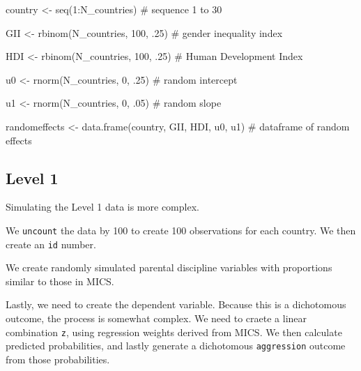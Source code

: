 \documentclass[
  letterpaper,
  DIV=11,
  numbers=noendperiod]{scrreprt}
\newenvironment{Shaded}{\begin{snugshade}}{\end{snugshade}}
\newcommand{\CommentTok}[1]{\textcolor[rgb]{0.37,0.37,0.37}{#1}}
\newcommand{\DecValTok}[1]{\textcolor[rgb]{0.68,0.00,0.00}{#1}}
\newcommand{\FunctionTok}[1]{\textcolor[rgb]{0.28,0.35,0.67}{#1}}
\newcommand{\NormalTok}[1]{\textcolor[rgb]{0.00,0.23,0.31}{#1}}
\newcommand{\OtherTok}[1]{\textcolor[rgb]{0.00,0.23,0.31}{#1}}
\newcommand{\SpecialCharTok}[1]{\textcolor[rgb]{0.37,0.37,0.37}{#1}}
\begin{document}
\begin{Shaded}
\begin{Highlighting}[]
\NormalTok{country }\OtherTok{\textless{}{-}} \FunctionTok{seq}\NormalTok{(}\DecValTok{1}\SpecialCharTok{:}\NormalTok{N\_countries) }\CommentTok{\# sequence 1 to 30}

\NormalTok{GII }\OtherTok{\textless{}{-}} \FunctionTok{rbinom}\NormalTok{(N\_countries, }\DecValTok{100}\NormalTok{, .}\DecValTok{25}\NormalTok{) }\CommentTok{\# gender inequality index}

\NormalTok{HDI }\OtherTok{\textless{}{-}} \FunctionTok{rbinom}\NormalTok{(N\_countries, }\DecValTok{100}\NormalTok{, .}\DecValTok{25}\NormalTok{) }\CommentTok{\# Human Development Index}

\NormalTok{u0 }\OtherTok{\textless{}{-}} \FunctionTok{rnorm}\NormalTok{(N\_countries, }\DecValTok{0}\NormalTok{, .}\DecValTok{25}\NormalTok{) }\CommentTok{\# random intercept}

\NormalTok{u1 }\OtherTok{\textless{}{-}} \FunctionTok{rnorm}\NormalTok{(N\_countries, }\DecValTok{0}\NormalTok{, .}\DecValTok{05}\NormalTok{) }\CommentTok{\# random slope}

\NormalTok{randomeffects }\OtherTok{\textless{}{-}} \FunctionTok{data.frame}\NormalTok{(country, }
\NormalTok{                            GII, }
\NormalTok{                            HDI, }
\NormalTok{                            u0, }
\NormalTok{                            u1) }\CommentTok{\# dataframe of random effects}
\end{Highlighting}
\end{Shaded}

\hypertarget{level-1}{%
\subsection{Level 1}\label{level-1}}

Simulating the Level 1 data is more complex.

We \texttt{uncount} the data by 100 to create 100 observations for each
country. We then create an \texttt{id} number.

We create randomly simulated parental discipline variables with
proportions similar to those in MICS.

Lastly, we need to create the dependent variable. Because this is a
dichotomous outcome, the process is somewhat complex. We need to craete
a linear combination \texttt{z}, using regression weights derived from
MICS. We then calculate predicted probabilities, and lastly generate a
dichotomous \texttt{aggression} outcome from those probabilities.
\end{document}
